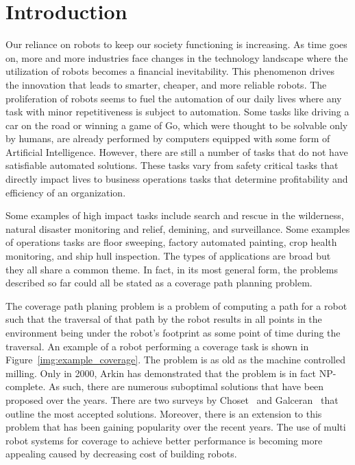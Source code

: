 \documentclass[../main.tex]{subfiles}
\begin{document}
\chapter{Introduction}
\label{chapter:introduction}

Our reliance on robots to keep our society functioning is increasing. As time goes on, more and more industries face changes in the technology landscape where the utilization of robots becomes a financial inevitability. This phenomenon drives the innovation that leads to smarter, cheaper, and more reliable robots. The proliferation of robots seems to fuel the automation of our daily lives where any task with minor repetitiveness is subject to automation. Some tasks like driving a car on the road or winning a game of Go, which were thought to be solvable only by humans, are already performed by computers equipped with some form of Artificial Intelligence. However, there are still a number of tasks that do not have satisfiable automated solutions. These tasks vary from safety critical tasks that directly impact lives to business operations tasks that determine profitability and efficiency of an organization.

Some examples of high impact tasks include search and rescue in the wilderness, natural disaster monitoring and relief, demining, and surveillance. Some examples of operations tasks are floor sweeping, factory automated painting, crop health monitoring, and ship hull inspection. The types of applications are broad but they all share a common theme. In fact, in its most general form, the problems described so far could all be stated as a coverage path planning problem.

The coverage path planing problem is a problem of computing a path for a robot such that the traversal of that path by the robot results in all points in the environment being under the robot's footprint as some point of time during the traversal. An example of a robot performing a coverage task is shown in Figure~\ref{img:example_coverage}. The problem is as old as the machine controlled milling. Only in 2000, Arkin\cite{arkin2000approximation} has demonstrated that the problem is in fact NP-complete. As such, there are numerous suboptimal solutions that have been proposed over the years. There are two surveys by Choset~\cite{choset2000coverage} and Galceran~\cite{galceran2013survey} that outline the most accepted solutions. Moreover, there is an extension to this problem that has been gaining popularity over the recent years. The use of multi robot systems for coverage to achieve better performance is becoming more appealing caused by decreasing cost of building robots.
\end{document}
